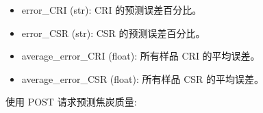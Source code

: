 \documentclass[a4paper,12pt,english]{sphinxmanual}
\begin{document}
\begin{fulllineitems}
\begin{description}
\begin{description}
\begin{itemize}
\item {} 
\sphinxAtStartPar
error\_CRI (str): CRI 的预测误差百分比。

\item {} 
\sphinxAtStartPar
error\_CSR (str): CSR 的预测误差百分比。

\item {} 
\sphinxAtStartPar
average\_error\_CRI (float): 所有样品 CRI 的平均误差。

\item {} 
\sphinxAtStartPar
average\_error\_CSR (float): 所有样品 CSR 的平均误差。

\end{itemize}

\end{description}

\sphinxAtStartPar
使用 POST 请求预测焦炭质量:

\begin{sphinxVerbatim}[commandchars=\\\{\}]
 

\PYG{p}{[}
         
         
         
         
         
         
\PYG{p}{]}


\end{sphinxVerbatim}
\end{description}
\end{fulllineitems}
\end{document}

